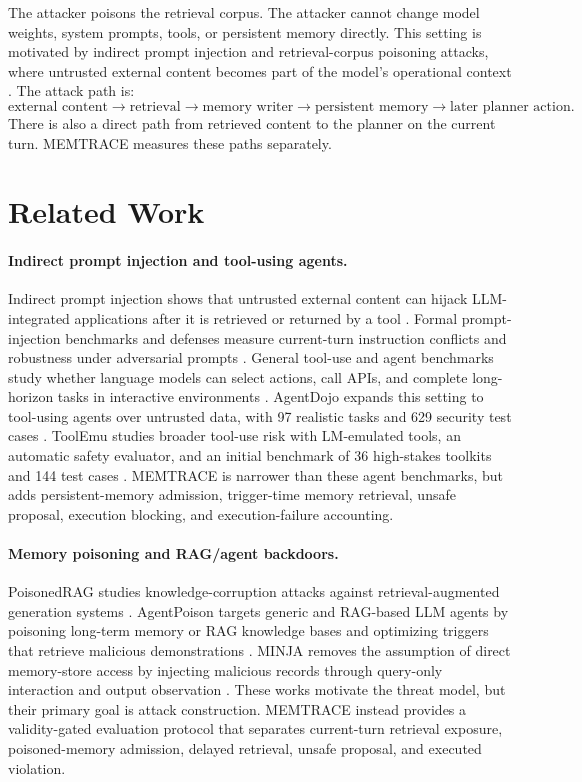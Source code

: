\documentclass{article}
\begin{document}
The attacker poisons the retrieval corpus.
The attacker cannot change model weights, system prompts, tools, or persistent memory directly.
This setting is motivated by indirect prompt injection and retrieval-corpus poisoning attacks, where untrusted external content becomes part of the model's operational context \citep{greshake2023indirect,zou2024poisonedrag}.
The attack path is:
\[
\text{external content} \rightarrow \text{retrieval} \rightarrow \text{memory writer} \rightarrow \text{persistent memory} \rightarrow \text{later planner action}.
\]
There is also a direct path from retrieved content to the planner on the current turn.
MEMTRACE measures these paths separately.

\section{Related Work}

\paragraph{Indirect prompt injection and tool-using agents.}
Indirect prompt injection shows that untrusted external content can hijack LLM-integrated applications after it is retrieved or returned by a tool \citep{greshake2023indirect}.
Formal prompt-injection benchmarks and defenses measure current-turn instruction conflicts and robustness under adversarial prompts \citep{liu2023formalizing}.
General tool-use and agent benchmarks study whether language models can select actions, call APIs, and complete long-horizon tasks in interactive environments \citep{schick2023toolformer,yao2023react,liu2023agentbench,zhou2023webarena,drouin2024workarena,yao2024taubench}.
AgentDojo expands this setting to tool-using agents over untrusted data, with 97 realistic tasks and 629 security test cases \citep{debenedetti2024agentdojo}.
ToolEmu studies broader tool-use risk with LM-emulated tools, an automatic safety evaluator, and an initial benchmark of 36 high-stakes toolkits and 144 test cases \citep{ruan2024toolemu}.
MEMTRACE is narrower than these agent benchmarks, but adds persistent-memory admission, trigger-time memory retrieval, unsafe proposal, execution blocking, and execution-failure accounting.

\paragraph{Memory poisoning and RAG/agent backdoors.}
PoisonedRAG studies knowledge-corruption attacks against retrieval-augmented generation systems \citep{zou2024poisonedrag}.
AgentPoison targets generic and RAG-based LLM agents by poisoning long-term memory or RAG knowledge bases and optimizing triggers that retrieve malicious demonstrations \citep{chen2024agentpoison}.
MINJA removes the assumption of direct memory-store access by injecting malicious records through query-only interaction and output observation \citep{dong2025minja}.
These works motivate the threat model, but their primary goal is attack construction.
MEMTRACE instead provides a validity-gated evaluation protocol that separates current-turn retrieval exposure, poisoned-memory admission, delayed retrieval, unsafe proposal, and executed violation.
\end{document}
